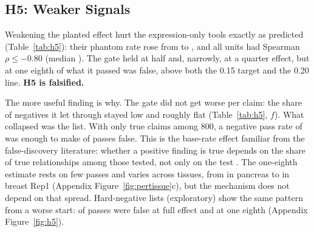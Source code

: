 \documentclass[letterpaper]{article} %
\begin{document}
\subsection{H5: Weaker Signals}
Weakening the planted effect hurt the expression-only tools exactly as predicted (Table~\ref{tab:h5}): their phantom
rate rose from \hfiveDefaultOnePR{} to \hfiveDefaultEighthPR{}, and all \hfiveNunitsLe{} units had Spearman
$\rho\leq-0.80$ (median \hfiveMedRho{}). The gate held at half and, narrowly, at a quarter effect, but at one eighth
\hfiveDefaultEighthPRafter{} \hfiveDefaultEighthPRafterci{} of what it passed was false, above both the 0.15 target and
the 0.20 line. \textbf{H5 is falsified.}

The more useful finding is why. The gate did not get worse per claim: the share of negatives it let through stayed low
and roughly flat (Table~\ref{tab:h5}, $f$). What collapsed was the list. With only \hfiveDefaultEighthNtrue{} true claims among 800, a negative
pass rate of \baseEighthNegPassRate{} was enough to make \baseEighthNegPassed{} of \hfiveDefaultEighthNpass{} passes
false. This is the base-rate effect familiar from the false-discovery literature: whether a positive finding is true
depends on the share of true relationships among those tested, not only on the test \cite{ioannidis2005}. The
one-eighth estimate rests on few passes and varies across tissues, from \hfiveEighthPRafterPancreas{} in pancreas to
\hfiveEighthPRafterBreastRepone{} in breast Rep1 (Appendix Figure~\ref{fig:pertissue}c), but the mechanism does not
depend on that spread. Hard-negative lists (exploratory) show the same pattern from a worse start:
\hfiveAfivemOnePRafter{} of passes were false at full effect and \hfiveAfivemEighthPRafter{} at one eighth (Appendix
Figure~\ref{fig:h5}).
\end{document}
